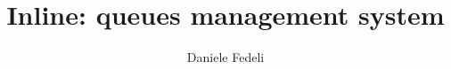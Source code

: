 \documentclass[Lau,binding=0.6cm]{sapthesis}
\title{Inline: queues management system}
\author{Daniele Fedeli}
\begin{document}
	
	\frontmatter
	
	\maketitle
	
	\dedication{"Il computer non è una macchina intelligente che aiuta le persone stupide, anzi, è una macchina stupida che funziona solo nelle mani delle persone intelligenti."	
	Umberto Eco}

	{\tableofcontents}
	\listoffigures
	\listoftables
	\mainmatter

	
	
	
	
	
	
	\backmatter
	\cleardoublepage
	
\end{document}
